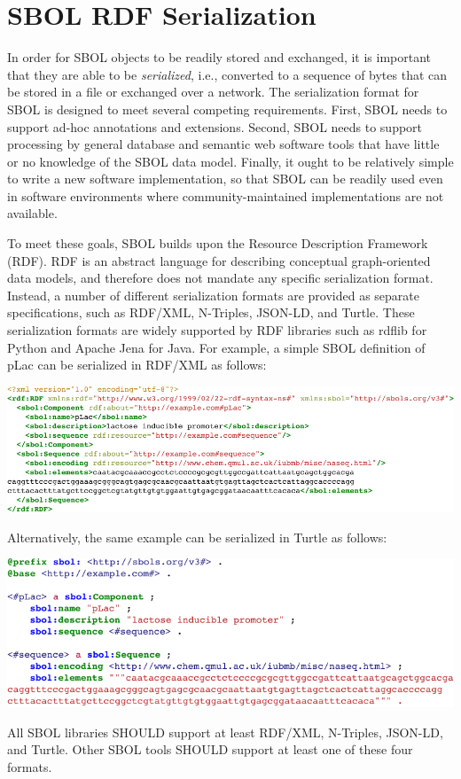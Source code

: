 \section{SBOL RDF Serialization}
\label{sec:serialization}

In order for SBOL objects to be readily stored and exchanged, it is important that they are able to be {\em serialized}, i.e., converted to a sequence of bytes that can be stored in a file or exchanged over a network.  The serialization format for SBOL is designed to meet several competing requirements. 
First, SBOL needs to support ad-hoc annotations and extensions. 
Second, SBOL needs to support processing by general database and semantic web software tools that have little or no knowledge of the SBOL data model. 
Finally, it ought to be relatively simple to write a new software implementation, so that SBOL can be readily used even in software environments where community-maintained implementations are not available.

To meet these goals, SBOL builds upon the Resource Description Framework (RDF).  RDF is an abstract language for describing conceptual graph-oriented data models, and therefore does not mandate any specific serialization format.  Instead, a number of different serialization formats are provided as separate specifications, such as RDF/XML, N-Triples, JSON-LD, and Turtle.  These serialization formats are widely supported by RDF libraries such as rdflib for Python and Apache Jena for Java.   For example, a simple SBOL definition of pLac can be serialized in RDF/XML as follows:

\vspace{3mm}
\includegraphics{example_serialization/example_rdfxml.pdf}

Alternatively, the same example can be serialized in Turtle as follows:

\vspace{3mm}
\includegraphics{example_serialization/example_turtle.pdf}

All SBOL libraries SHOULD support at least RDF/XML, N-Triples, JSON-LD, and Turtle.
Other SBOL tools SHOULD support at least one of these four formats.
